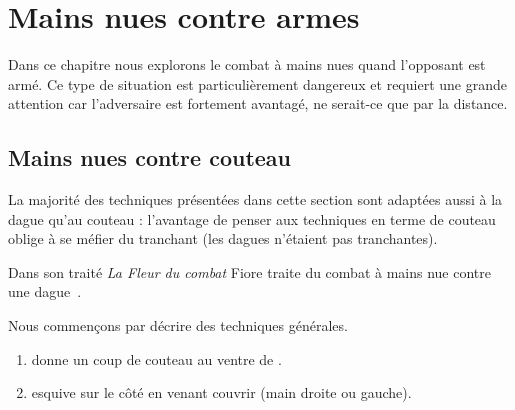 \chapter{Mains nues contre armes}


Dans ce chapitre nous explorons le combat à mains nues quand l'opposant est armé.
Ce type de situation est particulièrement dangereux et requiert une grande attention car l'adversaire est fortement avantagé, ne serait-ce que par la distance.


\section{Mains nues contre couteau}



La majorité des techniques présentées dans cette section sont adaptées aussi à la dague qu'au couteau : l'avantage de penser aux techniques en terme de couteau oblige à se méfier du tranchant (les dagues n'étaient pas tranchantes).

Dans son traité \emph{La Fleur du combat} Fiore traite du combat à mains nue contre une dague~\cite{deiLiberi:Conan:2014:FleurCombat:Dague}.

Nous commençons par décrire des techniques générales.


\begin{exercice}

\begin{enumerate}
	\item \A donne un coup de couteau au ventre de \D.
	
	\item \D esquive sur le côté en venant couvrir (main droite ou gauche).
\end{enumerate}
\end{exercice}



